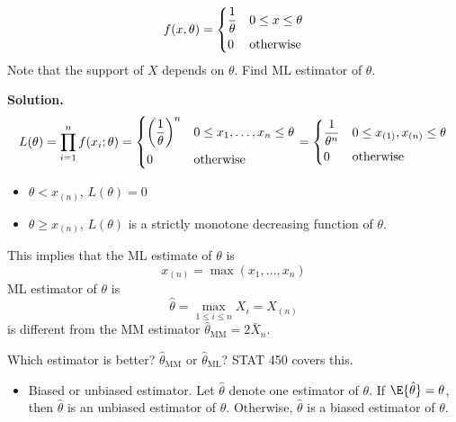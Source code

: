 \begin{Example}{}{}
    \[ f(x,\theta)=\begin{dcases}
            \frac{1}{\theta} & 0\le x\le \theta \\
            0                & \text{otherwise}
        \end{dcases} \]
    Note that the support of $ X $ depends on $ \theta $.
    Find ML estimator of $ \theta $.

    \textbf{Solution.}
    \[ L(\theta)=\prod_{i=1}^n f(x_i;\theta)
        =\begin{dcases}
            \biggl(\frac{1}{\theta} \biggr)^n & 0\le x_1,\ldots,x_n\le \theta \\
            0                                 & \text{otherwise}
        \end{dcases}=
        \begin{dcases}
            \frac{1}{\theta^n} & 0\le x_{(1)},x_{(n)}\le \theta \\
            0                  & \text{otherwise}
        \end{dcases} \]
    \begin{itemize}
        \item $ \theta<x_{(n)} $, $ L(\theta)=0 $
        \item $ \theta\ge x_{(n)} $, $ L(\theta) $
              is a strictly monotone decreasing function of $ \theta $.
    \end{itemize}
    This implies that the ML estimate of $ \theta $
    is
    \[ x_{(n)}=\max(x_1,\ldots,x_n) \]
    ML estimator of $ \theta $ is
    \[ \hat{\theta}=\max_{1\le i\le n}X_i=X_{(n)} \]
    is different from the MM estimator $ \hat{\theta}_{\text{MM}}=2\bar{X}_n $.

    Which estimator is better? $ \hat{\theta}_{\text{MM}} $
    or $ \hat{\theta}_{\text{ML}} $? STAT 450 covers this.
    \begin{itemize}
        \item Biased or unbiased estimator. Let $ \hat{\theta} $
              denote one estimator of $ \theta $. If $ \E{\hat{\theta}}=\theta $,
              then $ \hat{\theta} $ is an unbiased estimator of $ \theta $.
              Otherwise, $ \hat{\theta} $ is a biased estimator of $ \theta $.
    \end{itemize}
\end{Example}
